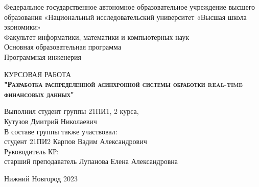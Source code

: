 \begin{titlepage}
\newpage

{
\begin{center}
Федеральное государственное автономное образовательное учреждение высшего образования «Национальный исследовательский университет «Высшая школа экономики»
\\
\bigskip
Факультет информатики, математики и компьютерных наук \\
Основная образовательная программа \\
Программная инженерия \\
\end{center}
}

\vspace{8em}

\begin{center}
{\Large КУРСОВАЯ РАБОТА}\\
\textsc{\textbf{
"Разработка распределенной асинхронной системы обработки real-time финансовых данных"}}
\end{center}

\vspace{2em}

{
\hfill\parbox{16cm}{
\hspace*{5cm}\hspace*{-5cm}Выполнил студент группы 21ПИ1, 2 курса,\\
 Кутузов Дмитрий Николаевич\\

\hspace*{5cm}\hspace*{-5cm}В составе группы также участвовал:\\
студент 21ПИ2 Карпов Вадим Александрович\\
 
\hspace*{5cm}\hspace*{-5cm}Руководитель КР:\\
старший преподаватель Лупанова Елена Александровна
\\
}
}

\vspace{\fill}

\begin{center}
Нижний Новгород 2023
\end{center}

\end{titlepage}
